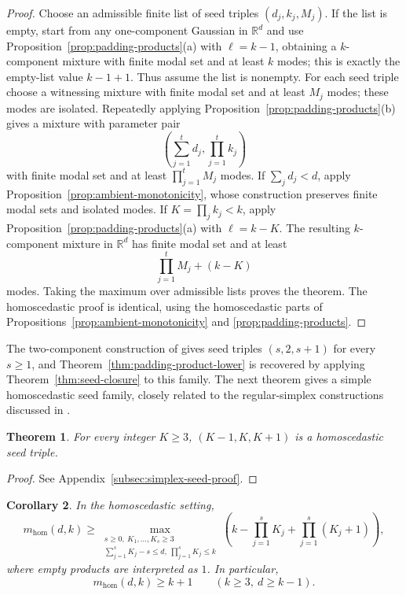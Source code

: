 \documentclass[11pt]{article}
\theoremstyle{plain}
\newtheorem{theorem}{Theorem}[section]
\newtheorem{corollary}[theorem]{Corollary}
\theoremstyle{definition}
\theoremstyle{remark}
\numberwithin{equation}{section}
\newcommand{\R}{\mathbb{R}}
\begin{document}
\begin{proof}
Choose an admissible finite list of seed triples $(d_j,k_j,M_j)$. If the list is empty, start from any one-component Gaussian in $\R^d$ and use Proposition~\ref{prop:padding-products}(a) with $\ell=k-1$, obtaining a $k$-component mixture with finite modal set and at least $k$ modes; this is exactly the empty-list value $k-1+1$. Thus assume the list is nonempty. For each seed triple choose a witnessing mixture with finite modal set and at least $M_j$ modes; these modes are isolated. Repeatedly applying Proposition~\ref{prop:padding-products}(b) gives a mixture with parameter pair
\[
\left(\sum_{j=1}^t d_j,\prod_{j=1}^t k_j\right)
\]
with finite modal set and at least $\prod_{j=1}^t M_j$ modes.
If $\sum_jd_j<d$, apply Proposition~\ref{prop:ambient-monotonicity}, whose construction preserves finite modal sets and isolated modes. If $K=\prod_jk_j<k$, apply Proposition~\ref{prop:padding-products}(a) with $\ell=k-K$. The resulting $k$-component mixture in $\R^d$ has finite modal set and at least
\[
\prod_{j=1}^tM_j+(k-K)
\]
modes. Taking the maximum over admissible lists proves the theorem. The homoscedastic proof is identical, using the homoscedastic parts of Propositions~\ref{prop:ambient-monotonicity} and \ref{prop:padding-products}.
\end{proof}

The two-component construction of \citet{RayRen2012} gives seed triples $(s,2,s+1)$ for every $s\ge1$, and Theorem~\ref{thm:padding-product-lower} is recovered by applying Theorem~\ref{thm:seed-closure} to this family. The next theorem gives a simple homoscedastic seed family, closely related to the regular-simplex constructions discussed in \citet{CarreiraPerpinanWilliams2003}.

\begin{theorem}\label{thm:simplex-seed}
For every integer $K\ge3$, $(K-1,K,K+1)$ is a homoscedastic seed triple.
\end{theorem}

\begin{proof}
See Appendix~\ref{subsec:simplex-seed-proof}.
\end{proof}

\begin{corollary}\label{cor:hom-simplex-product}
In the homoscedastic setting,
\[
m_{\mathrm{hom}}(d,k)\ge
\max_{\substack{s\ge0,\ K_1,\dots,K_s\ge3\\
\sum_{j=1}^sK_j-s\le d,\ \prod_{j=1}^sK_j\le k}}
\left(k-\prod_{j=1}^sK_j+\prod_{j=1}^s(K_j+1)\right),
\]
where empty products are interpreted as $1$. In particular,
\[
m_{\mathrm{hom}}(d,k)\ge k+1
\qquad(k\ge3,\ d\ge k-1).
\]
\end{corollary}
\end{document}
